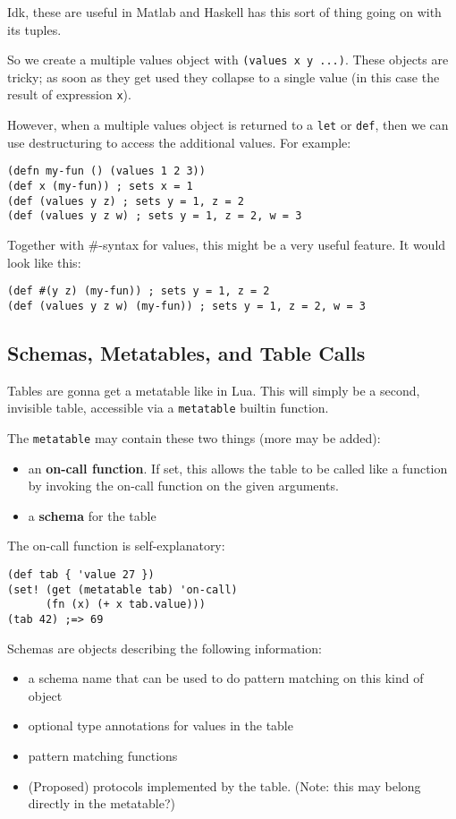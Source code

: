\documentclass[11pt]{article}
\begin{document}
Idk, these are useful in Matlab and Haskell has this sort of thing going on with
its tuples.

So we create a multiple values object with \texttt{(values x y ...)}. These objects are
tricky; as soon as they get used they collapse to a single value (in this case
the result of expression \texttt{x}).

However, when a multiple values object is returned to a \texttt{let} or \texttt{def}, then we can
use destructuring to access the additional values. For example:
\begin{verbatim}
(defn my-fun () (values 1 2 3))
(def x (my-fun)) ; sets x = 1
(def (values y z) ; sets y = 1, z = 2
(def (values y z w) ; sets y = 1, z = 2, w = 3
\end{verbatim}

Together with \#-syntax for values, this might be a very useful feature. It would
look like this:
\begin{verbatim}
(def #(y z) (my-fun)) ; sets y = 1, z = 2
(def (values y z w) (my-fun)) ; sets y = 1, z = 2, w = 3
\end{verbatim}


\subsection{Schemas, Metatables, and Table Calls}
\label{sec:org34618cf}

Tables are gonna get a metatable like in Lua. This will simply be a second,
invisible table, accessible via a \texttt{metatable} builtin function.

The \texttt{metatable} may contain these two things (more may be added):
\begin{itemize}
\item an \textbf{on-call function}. If set, this allows the table to be called like a
function by invoking the on-call function on the given arguments.
\item a \textbf{schema} for the table
\end{itemize}

The on-call function is self-explanatory:
\begin{verbatim}
(def tab { 'value 27 })
(set! (get (metatable tab) 'on-call) 
      (fn (x) (+ x tab.value)))
(tab 42) ;=> 69
\end{verbatim}

Schemas are objects describing the following information:
\begin{itemize}
\item a schema name that can be used to do pattern matching on this kind of object
\item optional type annotations for values in the table
\item pattern matching functions
\item (Proposed) protocols implemented by the table. (Note: this may belong directly
in the metatable?)
\end{itemize}
\end{document}
